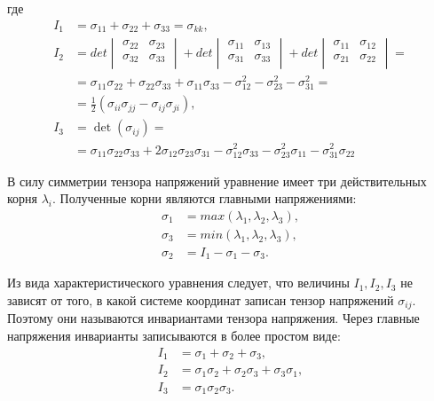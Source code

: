 где
\begin{align}
I_1 &= \sigma_{11}+\sigma_{22}+\sigma_{33} = \sigma_{kk}, \nonumber\\ 
I_2 &= det\begin{vmatrix} \sigma_{22} & \sigma_{23} \\ \sigma_{32} & \sigma_{33} \\ \end{vmatrix} + det\begin{vmatrix} \sigma_{11} & \sigma_{13} \\ \sigma_{31} & \sigma_{33} \\ \end{vmatrix} + det\begin{vmatrix} \sigma_{11} & \sigma_{12} \\ \sigma_{21} & \sigma_{22} \\ \end{vmatrix} = \nonumber\\ 
&= \sigma_{11}\sigma_{22}+\sigma_{22}\sigma_{33}+\sigma_{11}\sigma_{33}-\sigma_{12}^2-\sigma_{23}^2-\sigma_{31}^2 = \nonumber\\ 
&= \frac{1}{2}\left(\sigma_{ii}\sigma_{jj}-\sigma_{ij}\sigma_{ji}\right), \nonumber\\ 
I_3 &= \det(\sigma_{ij}) = \nonumber\\ 
&= \sigma_{11}\sigma_{22}\sigma_{33}+2\sigma_{12}\sigma_{23}\sigma_{31}-\sigma_{12}^2\sigma_{33}-\sigma_{23}^2\sigma_{11}-\sigma_{31}^2\sigma_{22}
\end{align}

В силу симметрии тензора напряжений уравнение имеет три действительных корня $\lambda_i$. Полученные корни являются главными напряжениями:
\begin{align}
\sigma_1 &= max \left( \lambda_1,\lambda_2,\lambda_3 \right), \nonumber\\
\sigma_3 &= min \left( \lambda_1,\lambda_2,\lambda_3 \right), \nonumber\\
\sigma_2 &= I_1-\sigma_1-\sigma_3.
\end{align}

Из вида характеристического уравнения следует, что величины $I_1, I_2, I_3$ не зависят от того, в какой системе координат записан тензор напряжений $\sigma_{ij}$. Поэтому они называются инвариантами тензора напряжения. Через главные напряжения инварианты записываются в более простом виде:
\begin{align}
I_1 &= \sigma_{1}+\sigma_{2}+\sigma_{3}, \nonumber\\ 
I_2 &= \sigma_{1}\sigma_{2}+\sigma_{2}\sigma_{3}+\sigma_{3}\sigma_{1}, \nonumber\\ 
I_3 &= \sigma_{1}\sigma_{2}\sigma_{3}.
\end{align}

